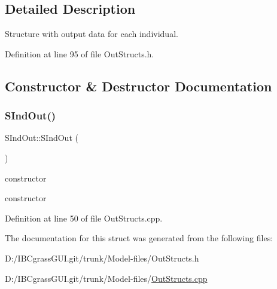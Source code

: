 \subsection{Detailed Description}
Structure with output data for each individual. 

Definition at line 95 of file Out\+Structs.\+h.



\subsection{Constructor \& Destructor Documentation}
\mbox{\label{struct_s_ind_out_aad1ccf88303096e29ae840531092d378}} 
\subsubsection{\texorpdfstring{SIndOut()}{SIndOut()}}
{\footnotesize\ttfamily S\+Ind\+Out\+::\+S\+Ind\+Out (\begin{DoxyParamCaption}{ }\end{DoxyParamCaption})}



constructor 

constructor 

Definition at line 50 of file Out\+Structs.\+cpp.



The documentation for this struct was generated from the following files\+:\begin{DoxyCompactItemize}
\item 
D\+:/\+I\+B\+Cgrass\+G\+U\+I.\+git/trunk/\+Model-\/files/Out\+Structs.\+h\item 
D\+:/\+I\+B\+Cgrass\+G\+U\+I.\+git/trunk/\+Model-\/files/\mbox{\hyperlink{_out_structs_8cpp}{Out\+Structs.\+cpp}}\end{DoxyCompactItemize}
